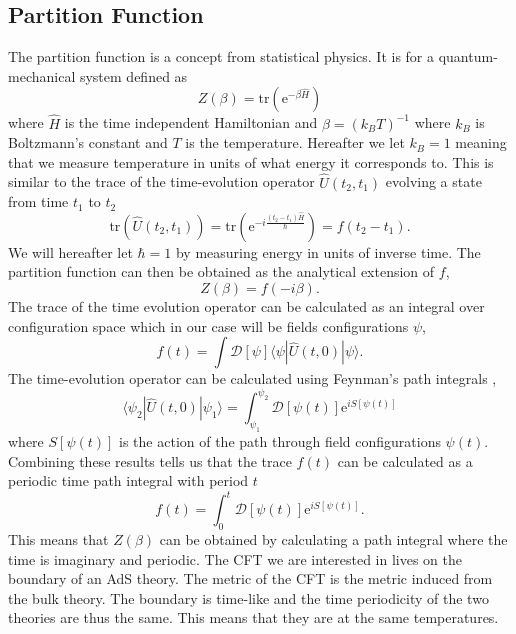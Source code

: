 \documentclass[12pt]{article}
\newcommand{\e}{\ensuremath{\mathrm{e}}}
\renewcommand{\i}{\ensuremath{i}}
\newcommand{\ket}[1]{|#1\rangle}
\newcommand{\bra}[1]{\langle#1|}
\newcommand{\bracket}[3]{\bra{#1}#2\ket{#3}}
\begin{document}
\subsection{Partition Function}
The partition function is a concept from statistical physics. It is for a quantum-mechanical system defined as
\begin{equation}
 Z(\beta)=\mathrm{tr}(\e^{-\beta\hat{H}})
\end{equation}
where $\hat{H}$ is the time independent Hamiltonian and $\beta=(k_BT)^{-1}$ where $k_B$ is Boltzmann's constant and $T$ is the temperature. Hereafter we let $k_B=1$ meaning that we measure temperature in units of what energy it corresponds to. This is similar to the trace of the time-evolution operator $\hat{U}(t_2,t_1)$ evolving a state from time $t_1$ to $t_2$
\begin{equation}
 \mathrm{tr}(\hat{U}(t_2,t_1))=\mathrm{tr}(\e^{-\i\frac{(t_2-t_1)\hat{H}}{\hbar}})=f(t_2-t_1).
\end{equation}
We will hereafter let $\hbar=1$ by measuring energy in units of inverse time. The partition function can then be obtained as the analytical extension of $f$,
\begin{equation}
 Z(\beta)=f(-\i\beta).
\end{equation}
The trace of the time evolution operator can be calculated as an integral over configuration space which in our case will be fields configurations $\psi$,
\begin{equation}
 f(t)=\int \mathcal{D}[\psi] \bracket{\psi}{\hat{U}(t,0)}{\psi}.
\end{equation}
The time-evolution operator can be calculated using Feynman's path integrals \cite{feynman1965quantum},
\begin{equation}
 \bracket{\psi_2}{\hat{U}(t,0)}{\psi_1}=\int_{\psi_1}^{\psi_2} \mathcal{D}[\psi(t)]\e^{\i S[\psi(t)]}
\end{equation}
where $S[\psi(t)]$ is the action of the path through field configurations $\psi(t)$. Combining these results tells us that the trace $f(t)$ can be calculated as a periodic time path integral with period $t$
\begin{equation}
 f(t)=\int_0^t \mathcal{D}[\psi(t)]\e^{\i S[\psi(t)]}.
\end{equation}
This means that $Z(\beta)$ can be obtained by calculating a path integral where the time is imaginary and periodic. The CFT we are interested in lives on the boundary of an AdS theory. The metric of the CFT is the metric induced from the bulk theory. The boundary is time-like and the time periodicity of the two theories are thus the same. This means that they are at the same temperatures.\\
\end{document}

